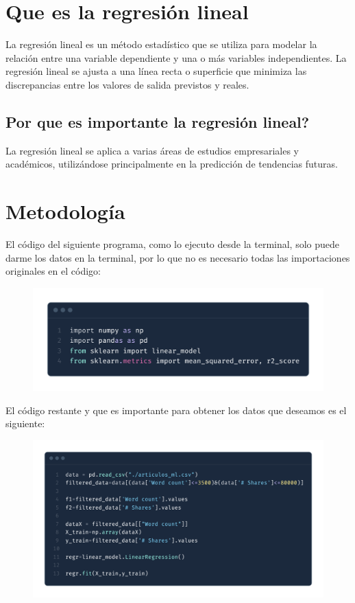 \section{Que es la regresión lineal}
La regresión lineal es un método estadístico que se utiliza para modelar la relación entre una variable dependiente y una o más variables independientes. La regresión lineal se ajusta a una línea recta o superficie que minimiza las discrepancias entre los valores de salida previstos y reales.
\subsection{Por que es importante la regresión lineal?}
La regresión lineal se aplica a varias áreas de estudios empresariales y académicos, utilizándose principalmente en la predicción de tendencias futuras.

\section{Metodología}
El código del siguiente programa, como lo ejecuto desde la terminal, solo puede darme los datos en la terminal, por lo que no es necesario todas las importaciones originales en el código:
\begin{figure}[h]
    \centering
    \includegraphics[width=0.5\linewidth]{image.png}
\end{figure}

El código restante y que es importante para obtener los datos que deseamos es el siguiente:
\begin{figure}[h]
    \centering
    \includegraphics[width=0.75\linewidth]{image_2.png}
\end{figure}

